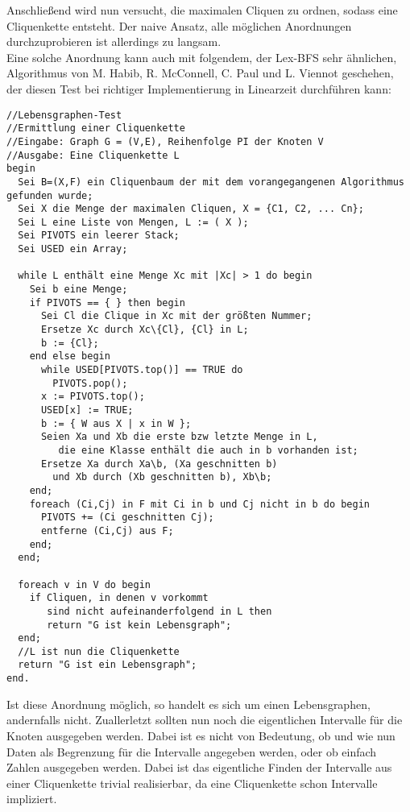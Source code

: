 Anschließend wird nun versucht, die maximalen Cliquen zu ordnen, sodass eine Cliquenkette entsteht. Der naive Ansatz, alle möglichen Anordnungen durchzuprobieren ist allerdings zu langsam.\\
Eine solche Anordnung kann auch mit folgendem, der Lex-BFS sehr ähnlichen, Algorithmus von M. Habib, R. McConnell, C. Paul und L. Viennot geschehen, der diesen Test bei richtiger Implementierung in Linearzeit durchführen kann:

\begin{lstlisting}
//Lebensgraphen-Test
//Ermittlung einer Cliquenkette
//Eingabe: Graph G = (V,E), Reihenfolge PI der Knoten V
//Ausgabe: Eine Cliquenkette L
begin
  Sei B=(X,F) ein Cliquenbaum der mit dem vorangegangenen Algorithmus gefunden wurde;
  Sei X die Menge der maximalen Cliquen, X = {C1, C2, ... Cn};
  Sei L eine Liste von Mengen, L := ( X );
  Sei PIVOTS ein leerer Stack;
  Sei USED ein Array;
  
  while L enthält eine Menge Xc mit |Xc| > 1 do begin
    Sei b eine Menge;
    if PIVOTS == { } then begin
      Sei Cl die Clique in Xc mit der größten Nummer;
      Ersetze Xc durch Xc\{Cl}, {Cl} in L;
      b := {Cl};
    end else begin
      while USED[PIVOTS.top()] == TRUE do
        PIVOTS.pop();
      x := PIVOTS.top();
      USED[x] := TRUE;
      b := { W aus X | x in W };
      Seien Xa und Xb die erste bzw letzte Menge in L,
         die eine Klasse enthält die auch in b vorhanden ist;
      Ersetze Xa durch Xa\b, (Xa geschnitten b)
        und Xb durch (Xb geschnitten b), Xb\b;
    end;
    foreach (Ci,Cj) in F mit Ci in b und Cj nicht in b do begin
      PIVOTS += (Ci geschnitten Cj);
      entferne (Ci,Cj) aus F;
    end;
  end;
  
  foreach v in V do begin
    if Cliquen, in denen v vorkommt 
       sind nicht aufeinanderfolgend in L then
       return "G ist kein Lebensgraph";
  end;
  //L ist nun die Cliquenkette
  return "G ist ein Lebensgraph";
end.
\end{lstlisting}

Ist diese Anordnung möglich, so handelt es sich um einen Lebensgraphen, andernfalls nicht.
Zuallerletzt sollten nun noch die eigentlichen Intervalle für die Knoten ausgegeben werden. Dabei ist es nicht von Bedeutung, ob und wie nun Daten als Begrenzung für die Intervalle angegeben werden, oder ob einfach Zahlen ausgegeben werden. Dabei ist das eigentliche Finden der Intervalle aus einer Cliquenkette trivial realisierbar,
 da eine Cliquenkette schon Intervalle impliziert.
 
